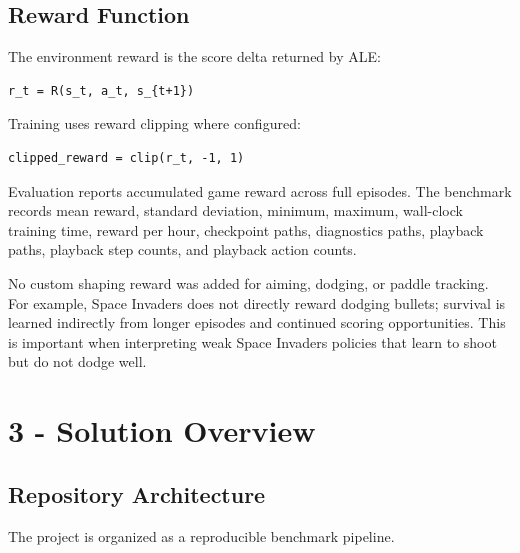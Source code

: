 \documentclass[11pt]{article}
\begin{document}
\subsection*{Reward Function}

The environment reward is the score delta returned by ALE:

\begin{verbatim}
r_t = R(s_t, a_t, s_{t+1})
\end{verbatim}

Training uses reward clipping where configured:

\begin{verbatim}
clipped_reward = clip(r_t, -1, 1)
\end{verbatim}

Evaluation reports accumulated game reward across full episodes. The benchmark records mean reward, standard deviation, minimum, maximum, wall-clock training time, reward per hour, checkpoint paths, diagnostics paths, playback paths, playback step counts, and playback action counts.

No custom shaping reward was added for aiming, dodging, or paddle tracking. For example, Space Invaders does not directly reward dodging bullets; survival is learned indirectly from longer episodes and continued scoring opportunities. This is important when interpreting weak Space Invaders policies that learn to shoot but do not dodge well.

\section*{3 - Solution Overview}

\subsection*{Repository Architecture}

The project is organized as a reproducible benchmark pipeline.
\end{document}
